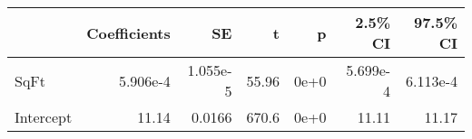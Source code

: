 \begin{tabular}{lrrrrrr}
\toprule
{} &  Coefficients &       SE &     t &    p &  2.5\% CI &  97.5\% CI \\
\midrule
SqFt      &      5.906e-4 & 1.055e-5 & 55.96 & 0e+0 & 5.699e-4 &  6.113e-4 \\
Intercept &         11.14 &   0.0166 & 670.6 & 0e+0 &    11.11 &     11.17 \\
\bottomrule
\end{tabular}
